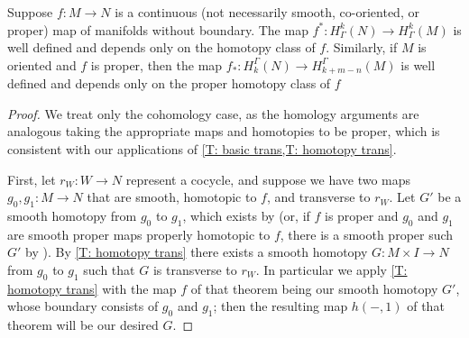 \begin{proposition}\label{P: cohomology pullback}
	Suppose $f \colon M \to N$ is a continuous (not necessarily smooth, co-oriented, or proper) map of manifolds without boundary.
	The map $f^* \colon H^k_\Gamma(N) \to H^k_\Gamma(M)$ is well defined and depends only on the homotopy class of $f$.
	Similarly, if $M$ is oriented and $f$ is proper, then the map $f_* \colon H_k^\Gamma(N) \to H_{k+m-n}^\Gamma(M)$ is well defined and depends only on the proper homotopy class of $f$
\end{proposition}

\begin{proof}
	We treat only the cohomology case, as the homology arguments are analogous taking the appropriate maps and homotopies to be proper, which is consistent with our applications of \cref{T: basic trans,T: homotopy trans}.
	
	First, let $r_W \colon W \to N$ represent a cocycle, and suppose we have two maps $g_0, g_1 \colon M \to N$ that are smooth, homotopic to $f$, and transverse to $r_W$. 
	Let $G'$ be a smooth homotopy from $g_0$ to $g_1$, which exists by \cite[Proposition 9.2.33]{MaDo92}  (or, if $f$ is proper and $g_0$ and $g_1$ are smooth proper maps properly homotopic to $f$, there is a smooth proper such $G'$ by \cite[Proposition 9.2.35]{MaDo92}).
	By \cref{T: homotopy trans} there exists a smooth homotopy $G \colon M \times I \to N$ from $g_0$ to $g_1$ such that $G$ is transverse to $r_W$. In particular we apply \cref{T: homotopy trans} with the map $f$ of that theorem being our smooth homotopy $G'$, whose boundary consists of $g_0$ and $g_1$; then the resulting map $h(-,1)$ of that theorem will be our desired $G$. 
		

\end{proof}

